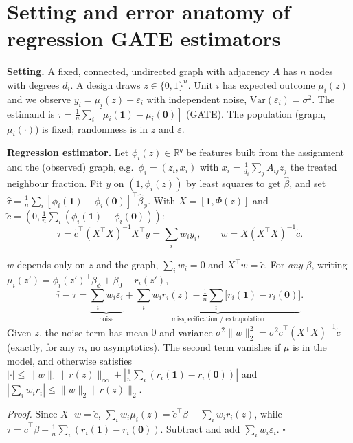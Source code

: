 \section{Setting and error anatomy of regression GATE estimators}\label{sec:theory}
\textbf{Setting.} A fixed, connected, undirected graph with adjacency $A$ has $n$ nodes with degrees $d_i$. A design draws $z\in\{0,1\}^n$. Unit $i$ has expected outcome $\mu_i(z)$ and we observe $y_i=\mu_i(z)+\varepsilon_i$ with independent noise, $\mathrm{Var}(\varepsilon_i)=\sigma^2$. The estimand is
$\tau=\frac1n\sum_i[\mu_i(\mathbf 1)-\mu_i(\mathbf 0)]$ (GATE). The population (graph, $\mu_i(\cdot)$) is fixed; randomness is in $z$ and $\varepsilon$.

\textbf{Regression estimator.} Let $\phi_i(z)\in\mathbb R^q$ be features built from the assignment and the (observed) graph, e.g.\ $\phi_i=(z_i,x_i)$ with $x_i=\frac1{d_i}\sum_jA_{ij}z_j$ the treated neighbour fraction. Fit $y$ on $(1,\phi_i(z))$ by least squares to get $\hat\beta$, and set $\hat\tau=\frac1n\sum_i[\phi_i(\mathbf 1)-\phi_i(\mathbf 0)]^\top\hat\beta_{\phi}$. With $X=[\mathbf 1,\Phi(z)]$ and $\tilde c=(0,\frac1n\sum_i(\phi_i(\mathbf 1)-\phi_i(\mathbf 0)))$:
\begin{equation}
\hat\tau=\tilde c^\top(X^\top X)^{-1}X^\top y=\textstyle\sum_iw_iy_i,\qquad w=X(X^\top X)^{-1}\tilde c.\label{eq:w}
\end{equation}
\begin{proposition}\label{prop:decomp}
$w$ depends only on $z$ and the graph, $\sum_iw_i=0$ and $X^\top w=\tilde c$. For \emph{any} $\beta$, writing $\mu_i(z')=\phi_i(z')^\top\beta_\phi+\beta_0+r_i(z')$,
\[
\hat\tau-\tau=\underbrace{\textstyle\sum_iw_i\varepsilon_i}_{\text{noise}}+\underbrace{\textstyle\sum_iw_ir_i(z)-\tfrac1n\textstyle\sum_i\big[r_i(\mathbf 1)-r_i(\mathbf 0)\big]}_{\text{misspecification / extrapolation}} .
\]
Given $z$, the noise term has mean $0$ and variance $\sigma^2\|w\|_2^2=\sigma^2\tilde c^\top(X^\top X)^{-1}\tilde c$ (exactly, for any $n$, no asymptotics). The second term vanishes if $\mu$ is in the model, and otherwise satisfies $|\cdot|\le\|w\|_1\|r(z)\|_\infty+|\frac1n\sum_i(r_i(\mathbf 1)-r_i(\mathbf 0))|$ and $|\sum_iw_ir_i|\le\|w\|_2\|r(z)\|_2$.
\end{proposition}
\emph{Proof.} Since $X^\top w=\tilde c$, $\sum_iw_i\mu_i(z)=\tilde c^\top\beta+\sum_iw_ir_i(z)$, while $\tau=\tilde c^\top\beta+\frac1n\sum_i(r_i(\mathbf 1)-r_i(\mathbf 0))$. Subtract and add $\sum_iw_i\varepsilon_i$. \hfill$\square$

